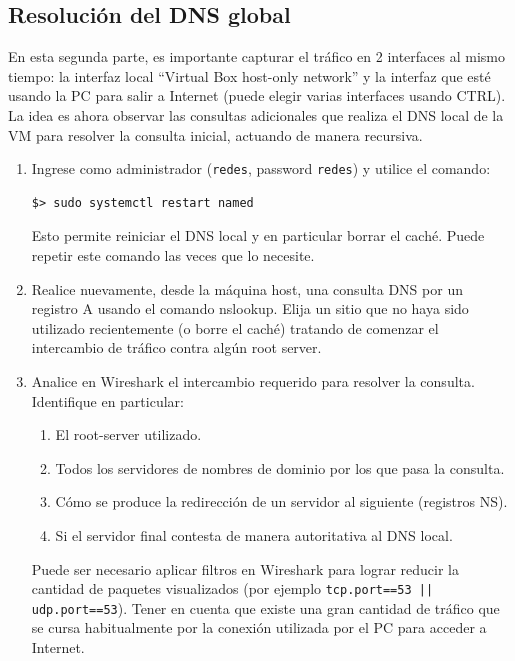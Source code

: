 \documentclass[a4paper,10pt]{article}
\begin{document}
\subsection*{Resolución del DNS global}

En esta segunda parte, es importante capturar el tráfico en 2 interfaces al mismo tiempo: la interfaz local ``Virtual Box host-only network'' y la interfaz que esté usando la PC para salir a Internet (puede elegir varias interfaces usando CTRL). La idea es ahora observar las consultas adicionales que realiza el DNS local de la VM para resolver la consulta inicial, actuando de manera recursiva.

\begin{enumerate}
    \item Ingrese como administrador (\texttt{redes}, password \texttt{redes}) y utilice el comando:
    \begin{verbatim}
$> sudo systemctl restart named
    \end{verbatim}
    Esto permite reiniciar el DNS local y en particular borrar el caché. Puede repetir este comando las veces que lo necesite.

    \item Realice nuevamente, desde la máquina host, una consulta DNS por un registro A usando el comando nslookup. Elija un sitio que no haya sido utilizado recientemente (o borre el caché) tratando de comenzar el intercambio de tráfico contra algún root server.
    
    \item Analice en Wireshark el intercambio requerido para resolver la consulta. Identifique en particular:
    \begin{enumerate}
        \item El root-server utilizado.
        \item Todos los servidores de nombres de dominio por los que pasa la consulta.
        \item Cómo se produce la redirección de un servidor al siguiente (registros NS).
        \item Si el servidor final contesta de manera autoritativa al DNS local.
    \end{enumerate}
    
    Puede ser necesario aplicar filtros en Wireshark para lograr reducir la cantidad de paquetes visualizados (por ejemplo \texttt{tcp.port==53 || udp.port==53}). Tener en cuenta que existe una gran cantidad de tráfico que se cursa habitualmente por la conexión utilizada por el PC para acceder a Internet.


\end{enumerate}
\end{document}
